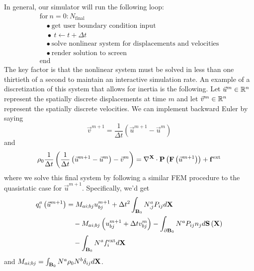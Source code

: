 In general, our simulator will run the following loop:
\begin{equation}
\begin{array}{lc}
\text{for} \ n = 0 : N_\text{final} \\
\quad \bullet \ \text{get user boundary condition input} \\
\quad \bullet \ t \leftarrow t + \Delta{t} \\
\quad \bullet \ \text{solve nonlinear system for displacements and velocities} \\
\quad \bullet \ \text{render solution to screen}\\
\text{end}
\end{array}
\end{equation}
The key factor is that the nonlinear system must be solved in less than one thirtieth of a second to maintain an interactive simulation rate. An example of a discretization of this system that allows for inertia is the following. Let $\vec{u}^m \in \mathbb{R}^n$ represent the spatially discrete displacements at time $m$ and let $\vec{v}^m \in \mathbb{R}^n$ represent the spatially discrete velocities. We can implement backward Euler by saying
\begin{equation*}
\vec{v}^{m+1} = \frac{1}{\Delta t} \left( \vec{u}^{m+1} - \vec{u}^m \right)
\end{equation*}
and
\begin{equation*}
\rho_0 \frac{1}{\Delta t} \left( \frac{1}{\Delta t} \left( \vec{u}^{m+1} - \vec{u}^m \right) - \vec{v}^m \right) = \nabla^{\mathbf{X}} \cdot \mathbf{P} \left( \mathbf{F} \left( \vec{u}^{m+1} \right) \right) + \mathbf{f}^{\text{ext}}
\end{equation*}
where we solve this final system by following a similar FEM procedure to the quasistatic case for $\vec{u}^{m+1}$. Specifically, we'd get
\begin{align*}
q^a_i \left( \vec{u}^{m+1} \right)
& = M_{ai;bj} u^{m+1}_{bj} + \Delta t^2 \int_{\mathbf{B}_0} N^a_{,j} P_{ij} d\mathbf{X} \\
& \quad {} - M_{ai;bj} \left( u^{m+1}_{bj} + \Delta{t} v^m_{bj} \right) - \int_{\partial\mathbf{B}_0} N^a P_{ij} n_j d\mathbf{S} \left( \mathbf{X} \right) \\
& \quad {} - \int_{\mathbf{B}_0} N^a f^{\text{ext}}_i d\mathbf{X}
\end{align*}
and $M_{ai;bj}=\int_{\mathbf{B}_0} N^a \rho_0 N^b \delta_{ij} d\mathbf{X}$.
